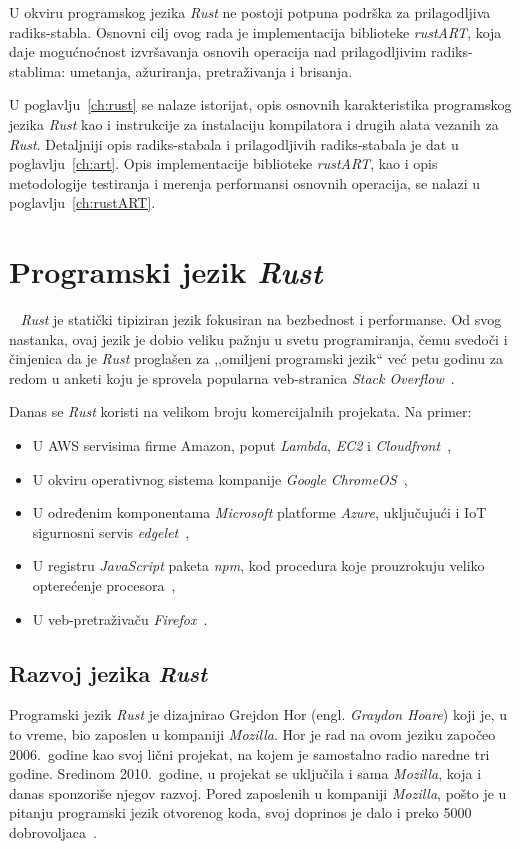 \documentclass[12pt,oneside]{memoir}
\begin{document}
U okviru programskog jezika \textit{Rust} ne postoji potpuna podrška za
prilagodljiva radiks-stabla. Osnovni cilj ovog rada je implementacija
biblioteke \textit{rustART}, koja daje mogućnoćnost izvršavanja osnovih operacija
nad prilagodljivim radiks-stablima: umetanja, ažuriranja, pretraživanja i brisanja.

U poglavlju~\ref{ch:rust} se nalaze istorijat, opis
osnovnih karakteristika programskog jezika \textit{Rust} kao i instrukcije
za instalaciju kompilatora i drugih alata vezanih za \textit{Rust}.
Detaljniji opis radiks-stabala i
prilagodljivih radiks-stabala je dat u poglavlju~\ref{ch:art}.
Opis implementacije biblioteke \textit{rustART}, kao i opis metodologije
testiranja i merenja performansi osnovnih operacija,
se nalazi u poglavlju~\ref{ch:rustART}.

\chapter{Programski jezik \emph{Rust}}~\label{ch:rust}
\emph{Rust} je statički tipiziran jezik  fokusiran na bezbednost i
performanse. Od svog nastanka, ovaj jezik
je dobio veliku pažnju u svetu programiranja, čemu svedoči i činjenica da je
\emph{Rust} proglašen za ,,omiljeni programski jezik`` već petu godinu za redom
u anketi koju je sprovela popularna veb-stranica \emph{Stack Overflow}~\cite{mostloved_so}.

Danas se \emph{Rust} koristi na velikom broju komercijalnih projekata. Na primer:

\begin{itemize}
    \item U AWS servisima firme Amazon, poput \emph{Lambda}, \emph{EC2}
        i \emph{Cloudfront}~\cite{aws},
    \item U okviru operativnog sistema kompanije \textit{Google}
        \emph{ChromeOS}~\cite{crosvm},
    \item U određenim komponentama \textit{Microsoft} platforme \emph{Azure}, uključujući i
        IoT sigurnosni servis \emph{edgelet}~\cite{edgelet},
    \item U registru \emph{JavaScript} paketa \emph{npm},
        kod procedura koje prouzrokuju veliko opterećenje procesora~\cite{npm},
    \item U veb-pretraživaču \textit{Firefox}~\cite{firefox_rust}.
\end{itemize}

\section{Razvoj jezika \emph{Rust}}
Programski jezik \emph{Rust} je dizajnirao Grejdon Hor
(engl. \emph{Graydon Hoare}) koji je, u to vreme, bio zaposlen u kompaniji
\textit{Mozilla}.
Hor je rad na ovom jeziku započeo 2006.\ godine kao svoj lični projekat,
na kojem je samostalno radio naredne tri godine.
Sredinom 2010.\ godine, u projekat se
uključila i sama \textit{Mozilla}, koja i danas sponzoriše njegov razvoj.
Pored zaposlenih u kompaniji \textit{Mozilla},
pošto je u pitanju programski jezik otvorenog koda,
svoj doprinos je dalo i preko 5000 dobrovoljaca~\cite{thanks_rust}.
\end{document}
